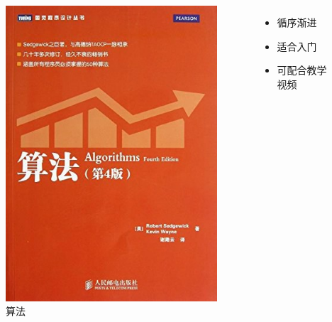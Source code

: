\begin{frame}{\insertsubsectionhead}
    \begin{columns}
        \vspace{4ex}
        \begin{figure}
            \centering
            \includegraphics[height=0.6\textheight]{images/sedgewick2011algorithms.jpg}
            \caption{算法\cite{sedgewick2011algorthims}}
            \label{fig:sedgewick2011algorithms}
        \end{figure}
        \begin{itemize}
            \item 循序渐进
            \item 适合入门
            \item 可配合教学视频
        \end{itemize}
    \end{columns}
\end{frame}

